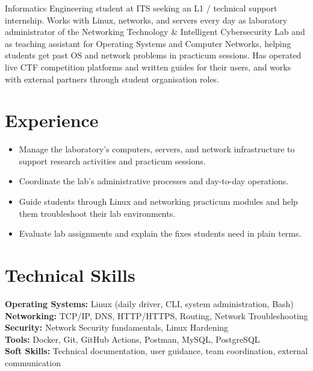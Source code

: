 



\cvheader

Informatics Engineering student at ITS seeking an L1 / technical support internship. Works with Linux, networks, and servers every day as laboratory administrator of the Networking Technology \& Intelligent Cybersecurity Lab and as teaching assistant for Operating Systems and Computer Networks, helping students get past OS and network problems in practicum sessions. Has operated live CTF competition platforms and written guides for their users, and works with external partners through student organisation roles.

\cveducation

\section{Experience}

\begin{itemize}
    \item Manage the laboratory's computers, servers, and network infrastructure to support research activities and practicum sessions.
    \item Coordinate the lab's administrative processes and day-to-day operations.
\end{itemize}

\vspace{2pt}

\begin{itemize}
    \item Guide students through Linux and networking practicum modules and help them troubleshoot their lab environments.
    \item Evaluate lab assignments and explain the fixes students need in plain terms.
\end{itemize}

\section{Technical Skills}

\textbf{Operating Systems:} Linux (daily driver, CLI, system administration, Bash) \\
\textbf{Networking:} TCP/IP, DNS, HTTP/HTTPS, Routing, Network Troubleshooting \\
\textbf{Security:} Network Security fundamentals, Linux Hardening \\
\textbf{Tools:} Docker, Git, GitHub Actions, Postman, MySQL, PostgreSQL \\
\textbf{Soft Skills:} Technical documentation, user guidance, team coordination, external communication

